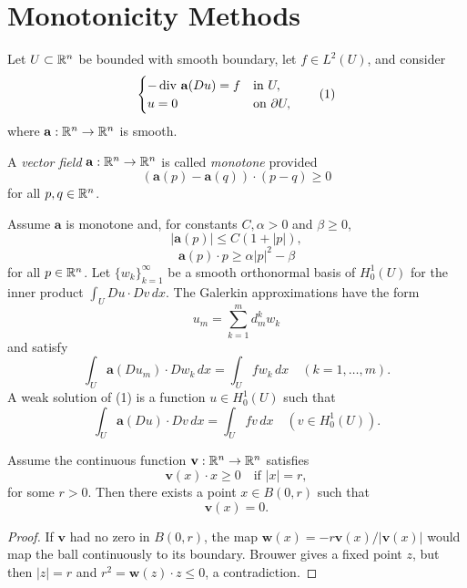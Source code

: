 
\section{Monotonicity Methods}
\label{sec:monotonicity-methods}

Let $U\subset\mathbb{R}^n$ be bounded with smooth boundary, let $f\in L^2(U)$, and consider
\[
\begin{cases}
-\operatorname{div}\,\mathbf a(Du)=f & \text{in }U,\\
u=0 & \text{on }\partial U,
\end{cases}
\tag{1}
\]
where $\mathbf a:\mathbb{R}^n\to\mathbb{R}^n$ is smooth.

\begin{definition}
\label{def:monotone-vector-field}
A \textit{vector field} $\mathbf{a} : \mathbb{R}^n \to \mathbb{R}^n$ is called \textit{monotone} provided
\[
(\mathbf{a}(p) - \mathbf{a}(q)) \cdot (p - q) \geq 0
\tag{3}
\]
for all $p, q \in \mathbb{R}^n$.
\end{definition}

Assume $\mathbf a$ is monotone and, for constants $C,\alpha>0$ and $\beta\geq0$,
\[
|\mathbf a(p)|\leq C(1+|p|),
\tag{4}
\]
\[
\mathbf a(p)\cdot p\geq\alpha|p|^2-\beta
\tag{5}
\]
for all $p\in\mathbb{R}^n$. Let $\{w_k\}_{k=1}^\infty$ be a smooth orthonormal basis of $H_0^1(U)$ for the inner product
$\int_U Du\cdot Dv\,dx$. The Galerkin approximations have the form
\[
u_m=\sum_{k=1}^m d_m^k w_k
\tag{6}
\]
and satisfy
\[
\int_U\mathbf a(Du_m)\cdot Dw_k\,dx=\int_Ufw_k\,dx
\quad(k=1,\ldots,m).
\tag{7}
\]
A weak solution of (1) is a function $u\in H_0^1(U)$ such that
\[
\int_U\mathbf a(Du)\cdot Dv\,dx=\int_Ufv\,dx
\quad(v\in H_0^1(U)).
\tag{12}
\]

\begin{lemma}
\label{lem:zeros-of-a-vector-field}

Assume the continuous function $\mathbf{v} : \mathbb{R}^n \to \mathbb{R}^n$ satisfies
\[
\mathbf{v}(x) \cdot x \geq 0 \quad \text{if } |x| = r,
\tag{8}
\]
for some $r > 0$. Then there exists a point $x \in B(0,r)$ such that
\[
\mathbf{v}(x) = 0.
\]
\end{lemma}

\begin{proof}
\sketch If $\mathbf v$ had no zero in $B(0,r)$, the map $\mathbf w(x)=-r\mathbf v(x)/|\mathbf v(x)|$ would map the ball continuously to its boundary. Brouwer gives a fixed point $z$, but then $|z|=r$ and $r^2=\mathbf w(z)\cdot z\leq0$, a contradiction.
\end{proof}

